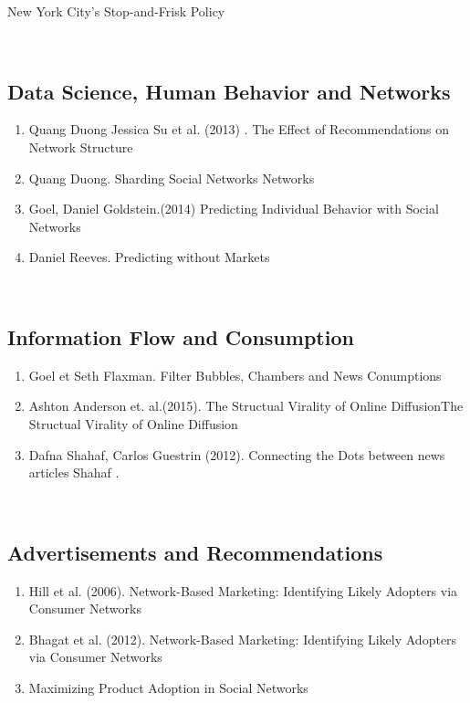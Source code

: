 \begin{enumerate}
New York City’s Stop-and-Frisk Policy  \end{enumerate}  \\  \subsection{Data Science, Human Behavior and Networks}  \begin{enumerate}  \item  Quang Duong Jessica Su  et al. (2013) . The Effect of Recommendations on Network Structure  \item  Quang Duong.  Sharding Social Networks\cite{Duong_2013} Networks  \item  Goel, Daniel  Goldstein.(2014)  Predicting Individual Behavior with Social Networks \cite{Goel_2014} \item  Daniel Reeves. Predicting without Markets  \end{enumerate}  \\  \subsection{Information Flow and Consumption}  \begin{enumerate}  \item  Goel et Seth Flaxman. Filter Bubbles, Chambers and News Conumptions  \item  Ashton Anderson et.  al.(2015).  The Structual Virality of Online DiffusionThe Structual Virality of Online Diffusion\cite{Goel_2015}  \item  Dafna Shahaf, Carlos Guestrin (2012). Connecting the Dots between news articles Shahaf  . \cite{Shahaf:2012:CTD:2086737.2086744} \end{enumerate}  \\  \subsection{Advertisements and Recommendations}  \begin{enumerate}  \item Hill et al. (2006).  Network-Based Marketing: Identifying Likely Adopters via Consumer Networks\cite{Hill_2006}  \item  Bhagat et al. (2012). Network-Based Marketing: Identifying Likely Adopters via Consumer Networks  \item   Maximizing Product Adoption in Social Networks\cite{Bhagat:2012:MPA:2124295.2124368} \end{enumerate} 